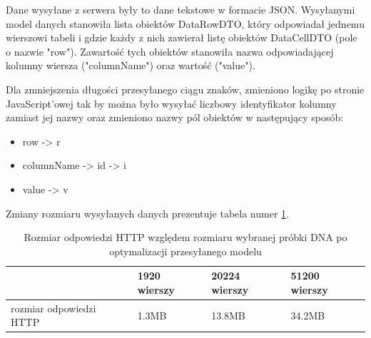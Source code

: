 \documentclass[a4paper,12pt,twoside]{article}
\begin{document}
Dane wysyłane z serwera były to dane tekstowe w formacie JSON.
Wysyłanymi model danych stanowiła lista obiektów DataRowDTO, 
który odpowiadał jednemu wierszowi tabeli i gdzie każdy z nich zawierał listę obiektów DataCellDTO (pole o nazwie "row"). Zawartość tych obiektów stanowiła nazwa 
odpowiadającej kolumny wiersza ("columnName") oraz wartość ("value").

Dla zmniejszenia długości przesyłanego ciągu znaków, 
zmieniono logikę po stronie JavaScript'owej tak by 
można było wysyłać liczbowy identyfikator kolumny zamiast jej nazwy
oraz zmieniono nazwy pól obiektów w następujący sposób:

\begin{itemize}
\item row -> r
\item columnName -> id -> i
\item value -> v
\end{itemize}
Zmiany rozmiaru wysyłanych danych prezentuje tabela numer \ref{table:requestSizeOpt}.
\begin{table} [H]
\begin{tabular}{| p{4cm} | p{2.7cm} | p{2.7cm} | p{2.7cm}|}
\hline
& 1920 wierszy &  20224 wierszy & 51200 wierszy\\ 
\hline
rozmiar odpowiedzi HTTP& 1.3MB&13.8MB& 34.2MB\\ \hline  
\end{tabular}
\caption{Rozmiar odpowiedzi HTTP względem rozmiaru wybranej próbki DNA po optymalizacji przesyłanego modelu}
\label{table:requestSizeOpt}
\end{table}

\newpage
\end{document}
